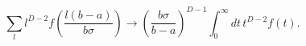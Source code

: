 \begin{equation}\label{abtoinfrepl}
  \sum_{l}l^{D-2}f\left( \frac{l(b-a)}{b\sigma }\right) \to
  \left( \frac{b\sigma }{b-a}\right) ^{D-1}\int_{0}^{\infty }
  dt\, t^{D-2}f(t).
\end{equation}

